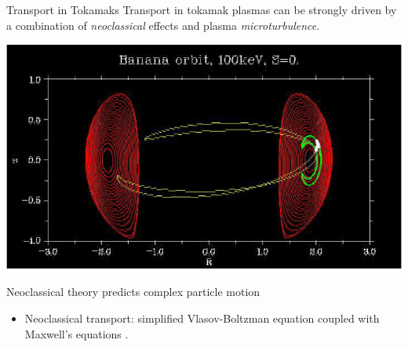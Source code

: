 \documentclass[11pt]{beamer}
\begin{document}
\begin{frame}

\begin{block}{Transport in Tokamaks}
Transport in tokamak plasmas can be strongly driven by a combination of {\em neoclassical} effects
and plasma {\em microturbulence}.
\end{block}



\centerline{\includegraphics[width=.7\textwidth]{banana_orbit.png}}

\centerline{Neoclassical theory predicts complex particle motion}

\begin{itemize}
\item Neoclassical transport:  simplified Vlasov-Boltzman equation coupled with Maxwell's equations \footnotemark[1].
\end{itemize}


\end{frame}
\end{document}
